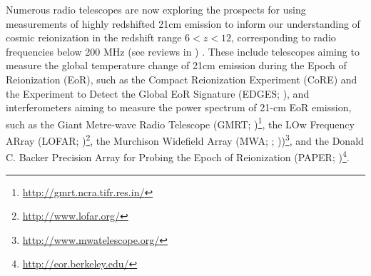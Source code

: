 \documentclass[preprint]{aastex}
\begin{document}
\begin{abstract}
We present a first catalog of broad-band spectral measurements from the 
Donald C. Backer Precision Array for Probing
the Epoch of Reionization (PAPER) in South Africa observed in July and
September of 2011.  In order to reduce the impact of beam calibration, which proves to
be a difficult endeavor for transit telescopes such as PAPER, on the determination
of source spectra, we have focused on calibrating sources in a narrow declination range.
Since each source follows a nearly identical path through the primary beam, this
restriction allows beam calibration to be nearly eliminated as a source of error,
yielding a dramatic improvement in the accuracy of source spectra measured in the 
100--200-MHz band that is receiving renewed attention by experiments seeking to
measure 21cm emission from the Epoch of Reionization (EoR).
Based on the variation in our data and the estimated error in the absolute
flux scale we bootstrap from multiple bright sources, we estimate PAPER measurements
of sources above XXX Jy to be accurate to 3.2\%.
When combined with catalog data at other frequencies, these data constrain parameters of
a power-law model for flux density with an uncertainty of 2.4\%.
This accuracy is limited by the uncertainty in the catalog measurements we use
to estimate an absolute flux scale, and represents 
an order of magnitude improvement over previous measurements in this band.  
Comparing with prior measurements, 45 out
of 58 sources observed are found to confirm and refine a power-law model for flux density.
This includes Pictor A, which provides a key flux reference for PAPER's EoR
power spectrum analysis.
\end{abstract}


Numerous radio telescopes are now exploring the prospects for using
measurements of highly redshifted 21cm emission to inform our understanding of
cosmic reionization in the redshift range $6< z<12$, corresponding to radio
frequencies below 200 MHz (see reviews in
\citealt{Furlanetto:2006p2267,Morales:2010p8093,Pritchard:2012p9555}) .  These
include telescopes aiming to measure the global temperature change of 21cm
emission during the Epoch of Reionization (EoR), such as the Compact
Reionization Experiment (CoRE) and the Experiment to Detect the Global EoR
Signature (EDGES; \citealt{Bowman:2010p8546}), and interferometers aiming to
measure the power spectrum of 21-cm EoR emission, such as the Giant Metre-wave
Radio Telescope (GMRT;
\citealt{Paciga:2011p9470,Paciga:2013p9627})\footnote{\url{http://gmrt.ncra.tifr.res.in/}},
the LOw Frequency ARray (LOFAR;
\citealt{Yatawatta:2013p9699})\footnote{\url{http://www.lofar.org/}}, the
Murchison Widefield Array (MWA;  \citealt{Bowman:2012p9138};
\citealt{Tingay:2013p9022}))\footnote{\url{http://www.mwatelescope.org/}}, and
the Donald C. Backer Precision Array for Probing the Epoch of Reionization
(PAPER; \citealt{Parsons:2010p6757,Parsons2013b})\footnote{\url{http://eor.berkeley.edu/}}.
\end{document}
